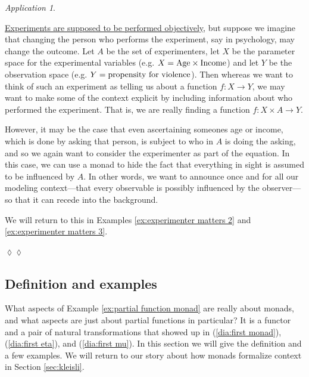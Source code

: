\documentclass{book}
\def\tn{\textnormal}
\def\to{\rightarrow}
\def\taking{\colon}
\theoremstyle{remark}
\newtheorem{app}[subsubsection]{Application}
\newenvironment{application}{\begin{app}}{\hspace*{\fill}$\lozenge\lozenge$\end{app}}
\theoremstyle{definition}
\begin{document}
\begin{application}\label{app:experimenter matters}

\href{http://en.wikipedia.org/wiki/Observer-expectancy_effect}{\text Experiments are supposed to be performed objectively}, but suppose we imagine that changing the person who performs the experiment, say in psychology, may change the outcome. Let $A$ be the set of experimenters, let $X$ be the parameter space for the experimental variables (e.g. $X=\tn{Age}\times\tn{Income}$) and let $Y$ be the observation space (e.g. $Y=\tn{propensity for violence}$). Then whereas we want to think of such an experiment as telling us about a function $f\taking X\to Y$, we may want to make some of the context explicit by including information about who performed the experiment. That is, we are really finding a function $f\taking X\times A\to Y$. 

However, it may be the case that even ascertaining someones age or income, which is done by asking that person, is subject to who in $A$ is doing the asking, and so we again want to consider the experimenter as part of the equation. In this case, we can use a monad to hide the fact that everything in sight is assumed to be influenced by $A$. In other words, we want to announce once and for all our modeling context---that every observable is possibly influenced by the observer---so that it can recede into the background.

We will return to this in Examples \ref{ex:experimenter matters 2} and \ref{ex:experimenter matters 3}.

\end{application}


\subsection{Definition and examples}

What aspects of Example \ref{ex:partial function monad} are really about monads, and what aspects are just about partial functions in particular? It is a functor and a pair of natural transformations that showed up in (\ref{dia:first monad}), (\ref{dia:first eta}), and (\ref{dia:first mu}). In this section we will give the definition and a few examples. We will return to our story about how monads formalize context in Section \ref{sec:kleisli}.
\end{document}
